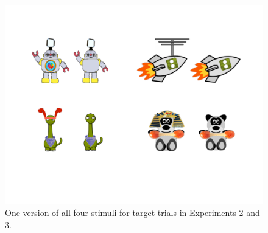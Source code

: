 \documentclass[man,noapacite]{apa2}
\begin{document}
\begin{figure}[tr]
\begin{center}
\includegraphics[width=6.5in]{figures/info_stims.pdf}
\caption{\label{fig:all_stims} One version of all four stimuli for target trials in Experiments 2 and 3.}
\end{center}
\end{figure}
\end{document}
